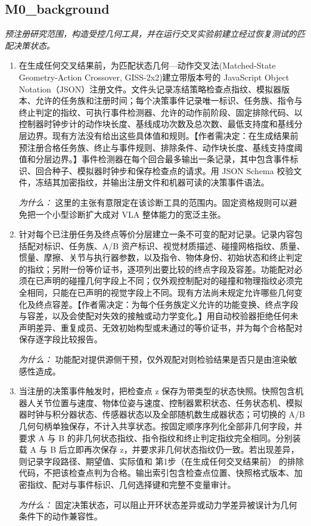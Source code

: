 \documentclass[10pt,a4paper]{article}
\begin{document}
\subsection*{M0\_background}
\emph{预注册研究范围，构造受控几何工具，并在运行交叉实验前建立经过恢复测试的匹配决策状态。}
\begin{enumerate}[leftmargin=*,start=1]
  \item 在生成任何交叉结果前，为匹配状态几何---动作交叉法(Matched-State Geometry-Action Crossover, GISS-2x2)建立带版本号的 JavaScript Object Notation（JSON）注册文件。文件头记录冻结策略检查点指纹、模拟器版本、允许的任务族和注册时间；每个决策事件记录唯一标识、任务族、指令与终止判定的指纹、可执行事件检测器、允许的动作前阶段、固定排除代码、以控制器时钟步计的动作块长度、基线成功次数及总次数、最低支持度和基线分层边界。现有方法没有给出这些具体值和规则。【作者需决定：在生成结果前预注册合格任务族、终止与事件规则、排除条件、动作块长度、基线支持度阈值和分层边界。】事件检测器在每个回合最多输出一条记录，其中包含事件标识、回合种子、模拟器时钟步和保存检查点的请求。用 JSON Schema 校验文件，冻结其加密指纹，并输出注册文件和机器可读的决策事件语法。
\par\emph{为什么：} 这里的主张有意限定在该诊断工具的范围内。固定资格规则可以避免把一个小型诊断扩大成对 VLA 整体能力的宽泛主张。
  \item 针对每个已注册任务及终点等价分层建立一条不可变的配对记录。记录内容包括配对标识、任务族、A/B 资产标识、视觉材质描述、碰撞网格指纹、质量、惯量、摩擦、关节与执行器参数，以及指令、物体身份、初始状态和终止判定的指纹；另附一份等价证书，逐项列出要比较的终点字段及容差。功能配对必须在已声明的碰撞几何字段上不同；仅外观控制配对的碰撞和物理指纹必须完全相同，只能在已声明的视觉字段上不同。现有方法尚未规定允许哪些几何变化及终点容差。【作者需决定：为每个任务族定义允许的功能变换、终点字段与容差，以及会使配对失效的接触或动力学变化。】用自动校验器拒绝任何未声明差异、重复成员、无效初始构型或未通过的等价证书，并为每个合格配对保存逐字段比较报告。
\par\emph{为什么：} 功能配对提供源侧干预，仅外观配对则检验结果是否只是由渲染敏感性造成。
  \item 当注册的决策事件触发时，把检查点 z 保存为带类型的状态快照。快照包含机器人关节位置与速度、物体位姿与速度、控制器累积状态、任务状态机、模拟器时钟与积分器状态、传感器状态以及全部随机数生成器状态；可切换的 A/B 几何句柄单独保存，不计入共享状态。按固定顺序序列化全部非几何字段，并要求 A 与 B 的非几何状态指纹、指令指纹和终止判定指纹完全相同。分别装载 A 与 B 后立即再次保存 z，并要求非几何状态指纹仍一致。若出现差异，则记录字段路径、期望值、实际值和 第1步（在生成任何交叉结果前） 的排除代码，不把该检查点判为合格。输出索引包含检查点位置、快照格式版本、加密指纹、配对与事件标识、几何选择键和完整不变量审计。
\par\emph{为什么：} 固定决策状态，可以阻止开环状态差异或动力学差异被误计为几何条件下的动作兼容性。
\end{enumerate}
\end{document}
